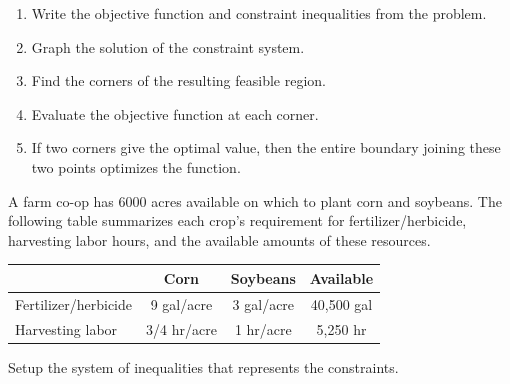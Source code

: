 \documentclass[../mathNotesPreamble]{subfiles}
\begin{document}
  \begin{thmBox*}
    \begin{enumerate}
      \item Write the objective function and constraint inequalities from the problem.
      \item Graph the solution of the constraint system.
      \item Find the corners of the resulting feasible region.
      \item Evaluate the objective function at each corner.
      \item If two corners give the optimal value, then the entire boundary joining these two points optimizes the function.
    \end{enumerate}
  \end{thmBox*}
  \begin{ex*}
    A farm co-op has 6000 acres available on which to plant corn and soybeans. The following table summarizes each crop's requirement for fertilizer/herbicide, harvesting labor hours, and the available amounts of these resources.
    \begin{center}
      \begin{tabular}{@{}lccc@{}}\toprule
        & \textbf{Corn}& \textbf{Soybeans}& \textbf{Available}\\\midrule
        Fertilizer/herbicide& 9 gal/acre& 3 gal/acre& 40,500 gal\\
        Harvesting labor& 3/4 hr/acre& 1 hr/acre& 5,250 hr\\\bottomrule
      \end{tabular}
    \end{center}
    Setup the system of inequalities that represents the constraints.
  \end{ex*}
\end{document}
